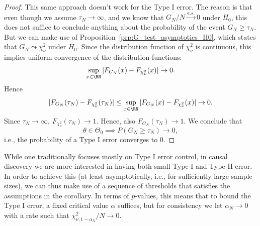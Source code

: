 \begin{proof}
This same approach doesn't work for the Type I error. The reason is that even though
we assume $\tau_N \to \infty$, and we know that $G_N / N \stackrel{a.s.}{\to} 0$ 
under $H_0$,
this does not suffice to conclude anything about the probability of the event 
$G_N \ge \tau_N$. But we can make use of Proposition~\ref{prp:G_test_asymptotics_H0},
which states that $G_N \leadsto \chi_{\nu}^2$ under $H_0$. 
Since the distribution function of $\chi_{\nu}^2$ is continuous,
this implies uniform convergence of the distribution functions:
  $$\sup_{x \in \RN} |F_{G_N}(x) - F_{\chi_{\nu}^2}(x)| \to 0.$$
Hence
  $$|F_{G_N}(\tau_N) - F_{\chi_{\nu}^2}(\tau_N)| \le \sup_{x\in\RN} |F_{G_N}(x) - F_{\chi_{\nu}^2}(x)| \to 0.$$
Since $\tau_N \to \infty$, $F_{\chi_{\nu}^2}(\tau_N) \to 1$.
Hence, also $F_{G_N}(\tau_N) \to 1$.
We conclude that 
  $$\theta \in \Theta_0 \implies P(G_N \ge \tau_N) \to 0,$$
i.e., the probability of a Type I error converges to 0.
\end{proof}

While one traditionally focuses mostly on Type I error control, in causal discovery we
are more interested in having both small Type I and Type II error. In order to achieve this
(at least asymptotically, i.e., for sufficiently large sample sizes), we can thus make use of a sequence of
thresholds that satisfies the assumptions in the corollary. In terms of $p$-values, this means
that to bound the Type I error, a fixed critical value $\alpha$ suffices, but for consistency we
let $\alpha_N \to 0$ with a rate such that $\chi^2_{\nu,1-\alpha_N} / N \to 0$.

